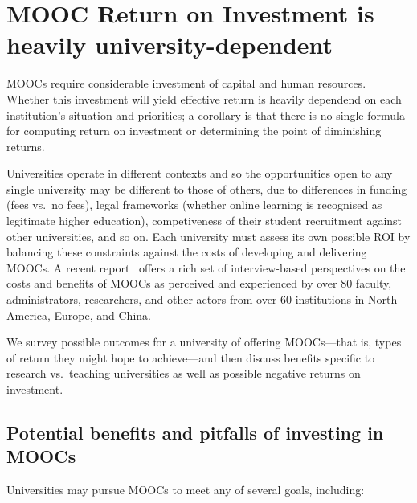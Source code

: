 \section{MOOC Return on Investment is heavily university-dependent}
\label{sec:roi}


MOOCs require considerable investment of capital and human resources.
Whether this investment will yield effective return is heavily dependend
on each institution's situation and priorities; a corollary is that
there is no single formula for computing return on investment or
determining the point of diminishing returns.

Universities operate in different contexts and so the opportunities open
to any single university may be different to those of others, due to
differences in funding (fees vs.\ no fees), legal frameworks (whether online
learning is recognised as legitimate higher education), competiveness of their
student recruitment against other universities, and so on.  Each
university must assess its own possible ROI by balancing these constraints
against the costs of developing and delivering MOOCs.
A recent report~\cite{moocs-expectations-and-reality} offers a rich set of
interview-based perspectives on the costs and benefits of MOOCs as
perceived and experienced by over 80 faculty, administrators,
researchers, and other actors from over 60 institutions in North
America, Europe, and China.

We survey possible outcomes for a university of offering MOOCs---that
is, types of return they might hope to achieve---and then discuss
benefits specific to research vs.\ teaching universities as well as
possible negative returns on investment.

\subsection{Potential benefits and pitfalls of investing in MOOCs}
 
Universities may pursue MOOCs to meet any of several goals, including:

